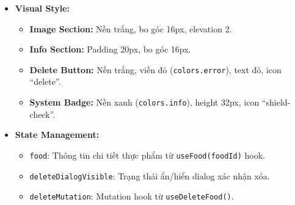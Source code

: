 \begin{itemize}
\begin{itemize}
            \item \textbf{Delete Action:} Nhấn nút ``Xóa thực phẩm'' $\rightarrow$ \texttt{Dialog} xác nhận $\rightarrow$ \texttt{deleteMutation.mutateAsync()}.
            \item \textbf{Navigation:} Nút Back gọi \texttt{onBack()} để quay lại danh sách.
        \end{itemize}
    \item \textbf{Visual Style:}
        \begin{itemize}
            \item \textbf{Image Section:} Nền trắng, bo góc 16px, elevation 2.
            \item \textbf{Info Section:} Padding 20px, bo góc 16px.
            \item \textbf{Delete Button:} Nền trắng, viền đỏ (\texttt{colors.error}), text đỏ, icon ``delete''.
            \item \textbf{System Badge:} Nền xanh (\texttt{colors.info}), height 32px, icon ``shield-check''.
        \end{itemize}
    \item \textbf{State Management:}
        \begin{itemize}
            \item \texttt{food}: Thông tin chi tiết thực phẩm từ \texttt{useFood(foodId)} hook.
            \item \texttt{deleteDialogVisible}: Trạng thái ẩn/hiển dialog xác nhận xóa.
            \item \texttt{deleteMutation}: Mutation hook từ \texttt{useDeleteFood()}.
        \end{itemize}
\end{itemize}

